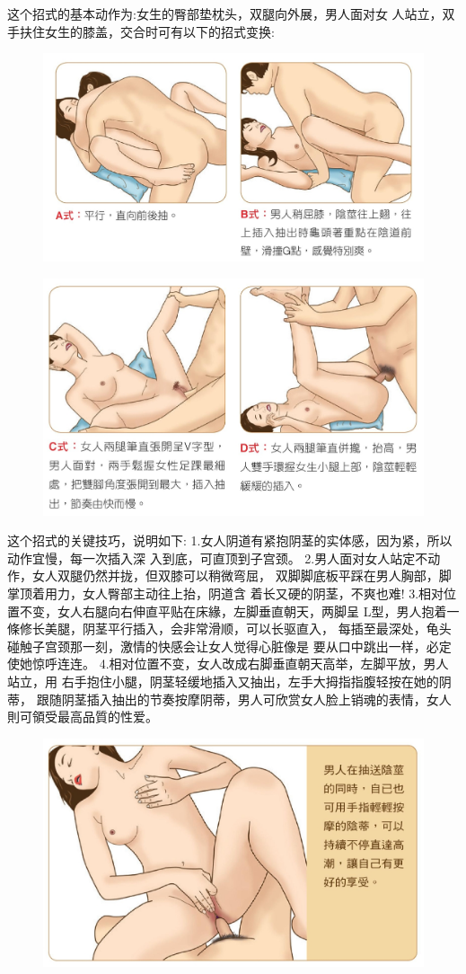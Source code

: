 \documentclass[12pt,UTF8]{ctexbook}
\begin{document}
这个招式的基本动作为:女生的臀部垫枕头，双腿向外展，男人面对女
人站立，双手扶住女生的膝盖，交合时可有以下的招式变换:

\begin{figure}[htbp]
	\centering
	\includegraphics[width=0.7\linewidth]{29}
	\caption{}
	\label{fig:1}
\end{figure}

\begin{figure}[htbp]
	\centering
	\includegraphics[width=0.7\linewidth]{30}
	\caption{}
	\label{fig:1}
\end{figure}

这个招式的关键技巧，说明如下:
1.女人阴道有紧抱阴茎的实体感，因为紧，所以动作宜慢，每一次插入深
入到底，可直顶到子宫颈。
2.男人面对女人站定不动作，女人双腿仍然并拢，但双膝可以稍微弯屈，
双脚脚底板平踩在男人胸部，脚掌顶着用力，女人臀部主动往上抬，阴道含
着长又硬的阴茎，不爽也难!
3.相对位置不变，女人右腿向右伸直平贴在床緣，左脚垂直朝天，两脚呈
L型，男人抱着一條修长美腿，阴茎平行插入，会非常滑顺，可以长驱直入，
每插至最深处，龟头碰触子宫颈那一刻，激情的快感会让女人觉得心脏像是
要从口中跳出一样，必定使她惊呼连连。
4.相对位置不变，女人改成右脚垂直朝天高举，左脚平放，男人站立，用
右手抱住小腿，阴茎轻缓地插入又抽出，左手大拇指指腹轻按在她的阴蒂，
跟随阴茎插入抽出的节奏按摩阴蒂，男人可欣赏女人脸上销魂的表情，女人
則可領受最高品質的性爱。

\begin{figure}[htbp]
	\centering
	\includegraphics[width=0.7\linewidth]{31}
	\caption{}
	\label{fig:1}
\end{figure}
\end{document}
